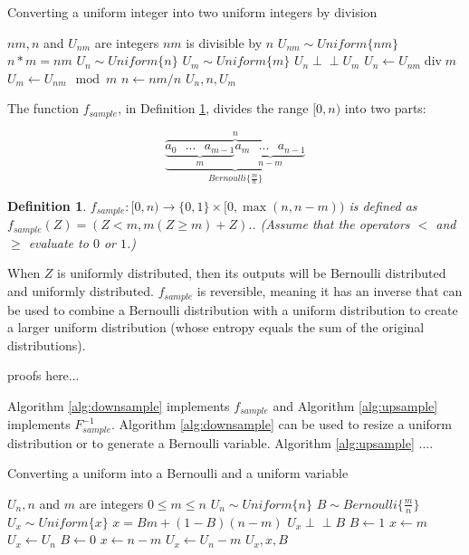 \documentclass[12pt]{article}
\newtheorem{definition}{Definition}
\newcommand{\indep}{\perp\!\!\!\perp}
\begin{document}
\begin{algorithm}
\caption{Converting a uniform integer into two uniform integers by division}
\label{alg:divide-uniform}
\begin{algorithmic}[1]
    \Require $nm, n$ and $U_{nm}$ are integers
    \Require $nm$ is divisible by $n$
    \Require $U_{nm} \sim Uniform\{nm\}$
    \Ensure $n * m = nm$
    \Ensure $U_{n} \sim Uniform\{n\}$
    \Ensure $U_{m} \sim Uniform\{m\}$
    \Ensure $U_n \indep U_m$
  \State $U_n \gets U_{nm} \operatorname{div} m$
  \State $U_m \gets U_{nm} \mod m$
  \State $n \gets nm / n$
  \State \Return $U_n, n, U_m$
\EndProcedure
\end{algorithmic}
\end{algorithm}


The function $f_{sample}$, in Definition \ref{def:sample}, divides the range $[0,n)$ into two parts:

\[
\overbrace{
    \underbrace{
        \underbrace{a_0 \text{   } ... \text{   } a_{m-1}}_{m}
        \underbrace{a_m \text{   } ... \text{   } a_{n-1}}_{n-m}}
    }_{Bernoulli\{\frac{m}{n}\}}^{n}
\]

\begin{definition}
$f_{sample}: [0,n) \rightarrow \{0,1\} \times [0,\max(n,n-m))$ is defined as $f_{sample}(Z) = (Z<m, m(Z\ge m) + Z).$. (Assume that the operators $<$ and $\ge$ evaluate to $0$ or $1$.)
\label{def:sample}
\end{definition}

When $Z$ is uniformly distributed, then its outputs will be Bernoulli distributed and uniformly distributed. $f_{sample}$ is reversible, meaning it has an inverse that can be used to combine a Bernoulli distribution with a uniform distribution to create a larger uniform distribution (whose entropy equals the sum of the original distributions).

proofs here...

Algorithm \ref{alg:downsample} implements $f_{sample}$ and Algorithm \ref{alg:upsample} implements $F^{-1}_{sample}$. Algorithm \ref{alg:downsample} can be used to resize a uniform distribution or to generate a Bernoulli variable. Algorithm \ref{alg:upsample} ....


\begin{algorithm}
\caption{Converting a uniform into a Bernoulli and a uniform variable}
\label{alg:downsample}
\begin{algorithmic}[1]
    \Require $U_n, n$ and $m$ are integers 
    \Require $0 \le m \le n$
    \Require $U_n \sim Uniform \{n\}$
    \Ensure $B \sim Bernoulli\{\frac{m}{n}\}$
    \Ensure $U_x \sim Uniform\{x\}$
    \Ensure $x = Bm + (1-B)(n-m)$
    \Ensure $U_x \indep B$
    \State $B \gets 1$  
    \State $x \gets m$
    \State $U_x \gets U_n$
  \Else
    \State $B \gets 0$  
    \State $x \gets n-m$
    \State $U_x \gets U_n-m$
  \EndIf
  \State \Return $U_x, x, B$
\EndProcedure
\end{algorithmic}
\end{algorithm}
\end{document}
